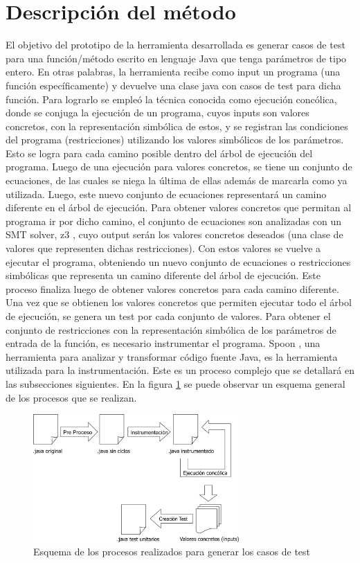 \documentclass{llncs}
\begin{document}
\section{Descripción del método}
El objetivo del prototipo de la herramienta desarrollada es generar casos de test para una función/método escrito en lenguaje Java que tenga parámetros de tipo
entero. En otras palabras, la herramienta recibe como input un programa (una función específicamente) y devuelve una clase java con casos de test para dicha función.
Para lograrlo se empleó la técnica conocida como ejecución concólica, donde se conjuga la ejecución de un programa, cuyos inputs son valores concretos,
con la representación simbólica de estos, y se registran las condiciones del programa (restricciones) utilizando los valores simbólicos de los parámetros.
Esto se logra para cada camino posible dentro del árbol de ejecución del programa. Luego de una ejecución para valores concretos, se tiene un conjunto de
ecuaciones, de las cuales se niega la última de ellas además de marcarla como ya utilizada. Luego, este nuevo conjunto de ecuaciones representará un camino
diferente en el árbol de ejecución. Para obtener valores concretos que permitan al programa ir por dicho camino, el conjunto de ecuaciones son analizadas
con un SMT solver, z3 \cite{z3solver}, cuyo output serán los valores concretos deseados (una clase de valores que representen dichas restricciones). Con estos valores se
vuelve a ejecutar el programa, obteniendo un nuevo conjunto de ecuaciones o restricciones simbólicas que representa un camino diferente del árbol de ejecución.
Este proceso finaliza luego de obtener valores concretos para cada camino diferente. Una vez que se obtienen los valores concretos que permiten ejecutar todo el
árbol de ejecución, se genera un test por cada conjunto de valores.
Para obtener el conjunto de restricciones con la representación simbólica de los parámetros de entrada de la función, es necesario instrumentar el programa.
Spoon \cite{spoon}, una herramienta para analizar y transformar código fuente Java, es la herramienta utilizada para la instrumentación.
Este es un proceso complejo que se detallará en las subsecciones siguientes.
En la figura \ref{fig:procesosRealizados} se puede observar un esquema general de los procesos que se realizan.

\begin{figure}
\centering
\includegraphics[width=0.7\textwidth]{procesosRealizados}
\caption{Esquema de los procesos realizados para generar los casos de test}
\label{fig:procesosRealizados}
\end{figure}
\end{document}
